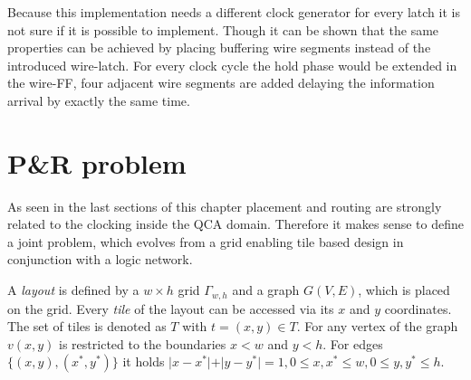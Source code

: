Because this implementation needs a different clock generator for every latch it is not sure if it is possible to implement. Though it can be shown that the same properties can be achieved by placing buffering wire segments instead of the introduced wire-latch. For every clock cycle the hold phase would be extended in the wire-FF, four adjacent wire segments are added delaying the information arrival by exactly the same time.


\section{P\&R problem} \label{sec:PR}

As seen in the last sections of this chapter placement and routing are strongly related to the clocking inside the QCA domain. Therefore it makes sense to define a joint problem, which evolves from a grid enabling tile based design in conjunction with a logic network.

\begin{definition}
	A \textit{layout} is defined by a $w \times h$ grid $\Gamma_{w, h}$ and a graph $G(V, E)$, which is placed on the grid. Every \textit{tile} of the layout can be accessed via its $x$ and $y$ coordinates. The set of tiles is denoted as $T$ with $t = (x, y) \in T$. For any vertex of the graph $v(x, y)$ is restricted to the boundaries $x < w$ and $y < h$. For edges $\{(x, y), (x^*, y^*)\}$ it holds $\vert x-x^*\vert+\vert y-y^*\vert = 1, 0 \leq x, x^* \leq w, 0 \leq y, y^* \leq h$.
\end{definition}


